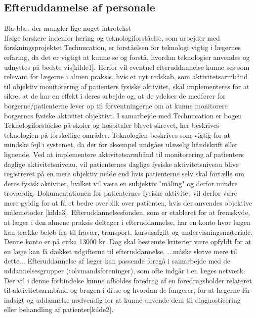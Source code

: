  
\subsection{Efteruddannelse af personale}
Bla bla.. der mangler lige noget introtekst\\

Ifølge forskere indenfor læring og teknologiforståelse, som arbejder med forskningsprojektet Technucation, er forståelsen for teknologi vigtig i lægernes erfaring, da det er vigtigt at kunne se og forstå, hvordan teknologier anvendes og udnyttes på bedste vis[kilde1]. Herfor vil eventuel efteruddannelse kunne ses som relevant for lægerne i almen praksis, hvis et nyt redskab, som aktivitetsarmbånd til objektiv monitorering af patienters fysiske aktivitet, skal implementeres for at sikre, at de har en effekt i deres arbejde og, at de ydelser de medfører for borgerne/patienterne lever op til forventningerne om at kunne monitorere borgernes fysiske aktivitet objektivt. I samarbejde med Technucation er bogen Teknologiforståelse på skoler og hospitaler blevet skrevet, her beskrives teknologien på forskellige områder. Teknologien beskrives som vigtig for at mindske fejl i systemet, da der for eksempel undgåes ulæselig håndskrift eller lignende. Ved at implementere aktivitetsarmbånd til monitorering af patienters daglige aktivitetsniveau, vil patienternes daglige fysiske aktivitetsniveau blive registreret på en mere objektiv måde end hvis patienterne selv skal fortælle om deres fysisk aktivitet, hvilket vil være en subjektiv "måling" og derfor mindre troværdig. Dokumentationen for patienternes fysiske aktivitet vil derfor være mere gyldig for at få et bedre overblik over patienten, hvis der anvendes objektive målemetoder [kilde3]. 
Efteruddannelsesfonden, som er etableret for at fremskyde, at læger i den almene praksis deltager i efteruddannelse, har en konto hvor lægen kan trække beløb fra til fravær, transport, kursusafgift og undervisningsmateriale. Denne konto er på cirka 13000 kr. Dog skal bestemte kriterier være opfyldt for at en læge kan få dækket udgifterne til efteruddannelse. ...måske skrive  mere til dette... Efteruddannelse af læger kan passende foregå i samarbejde med de uddannelsesgrupper (tolvmandsforeninger), som ofte indgår i en læges netværk. Der vil i denne forbindelse kunne afholdes foredrag af en foredragsholder relateret til aktivitetsarmbånd og brugen i disse og hvordan de fungerer, for at lægerne får indsigt og uddannelse nødvendig for at kunne anvende dem til diagnosticering eller behandling af patienter[kilde2]. 
\\

